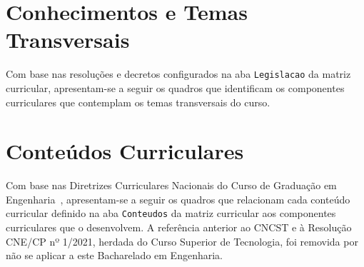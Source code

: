 \section{Conhecimentos e Temas Transversais}
\label{sec:temas_transversais}

Com base nas resoluções e decretos configurados na aba \texttt{Legislacao} da matriz curricular, apresentam-se a seguir os quadros que identificam os componentes curriculares que contemplam os temas transversais do curso.


\section{Conteúdos Curriculares}

Com base nas Diretrizes Curriculares Nacionais do Curso de Graduação em Engenharia~\cite{cne_ces_2_2019,cne_ces_1_2021}, apresentam-se a seguir os quadros que relacionam cada conteúdo curricular definido na aba \texttt{Conteudos} da matriz curricular aos componentes curriculares que o desenvolvem. A referência anterior ao CNCST e à Resolução CNE/CP nº 1/2021, herdada do Curso Superior de Tecnologia, foi removida por não se aplicar a este Bacharelado em Engenharia.

